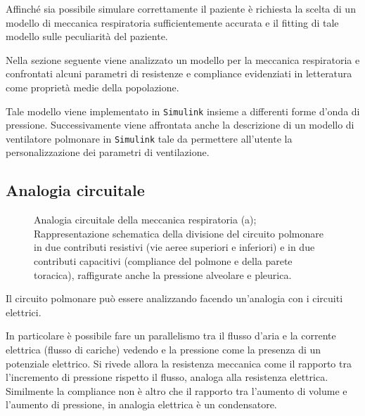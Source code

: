 Affinché sia possibile simulare correttamente il paziente è richiesta la scelta di un modello di meccanica respiratoria sufficientemente accurata e il fitting di tale modello sulle peculiarità del paziente.

Nella sezione seguente viene analizzato un modello per la meccanica respiratoria e confrontati alcuni parametri di resistenze e compliance evidenziati in letteratura come proprietà medie della popolazione.

Tale modello viene implementato in \texttt{Simulink} insieme a differenti forme d'onda di pressione. Successivamente viene affrontata anche la descrizione di un modello di ventilatore polmonare in  \texttt{Simulink} tale da permettere all'utente la personalizzazione dei parametri di ventilazione.



\subsection{Analogia circuitale}

\begin{figure}[t!]
	\begin{subfigure}{0.5\linewidth}
		\centering
		\small{
			\def\svgwidth{\linewidth}
			}
		\caption{}
		\label{fig:modello}
	\end{subfigure}\hfill
	\begin{subfigure}{0.5\linewidth}
		\centering
		\small{
			\def\svgwidth{0.7\linewidth}
			}
		\caption{}
	\end{subfigure}\hfill
	\caption{Analogia circuitale della meccanica respiratoria \cite{khoo_physiological_2018} (a); Rappresentazione schematica della divisione del circuito polmonare in due contributi resistivi (vie aeree superiori e inferiori) e in due contributi capacitivi (compliance del polmone e della parete toracica), raffigurate anche la pressione alveolare e pleurica.}
\end{figure}

Il circuito polmonare può essere analizzando facendo un'analogia con i circuiti elettrici.

In particolare è possibile fare un parallelismo tra il flusso d'aria e la corrente elettrica (flusso di cariche) vedendo e la pressione come la presenza di un potenziale elettrico.
Si rivede allora la resistenza meccanica come il rapporto tra l'incremento di pressione rispetto il flusso, analoga alla resistenza elettrica. Similmente la compliance non è altro che il rapporto tra l'aumento di volume e l'aumento di pressione, in analogia elettrica è un condensatore.

